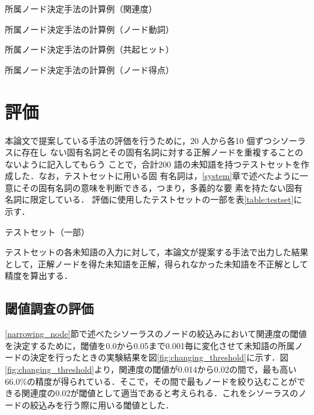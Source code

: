 \documentclass[japanese]{jnlp_1.4}
\begin{document}
\begin{table}[b]
\caption{所属ノード決定手法の計算例（関連度）}

\label{table:calculation_example_doa}
\end{table}

\begin{table}[t]
\caption{所属ノード決定手法の計算例（ノード動詞）}

\label{table:calculation_example_node_verb}
\end{table}
\begin{table}[t]
\caption{所属ノード決定手法の計算例（共起ヒット）}

\label{table:calculation_example_coincidence_hit}
\end{table}
\begin{table}[t]
\caption{所属ノード決定手法の計算例（ノード得点）}

\label{table:calculation_example_node_value}
\end{table}


\section{評価}\label{evaluation}

本論文で提案している手法の評価を行うために，20 人から各10 個ずつシソーラスに存在し
ない固有名詞とその固有名詞に対する正解ノードを重複することのないように記入してもらう
ことで，合計200 語の未知語を持つテストセットを作成した．なお，テストセットに用いる固
有名詞は，\ref{system}章で述べたように一意にその固有名詞の意味を判断できる，つまり，多義的な要
素を持たない固有名詞に限定している．
評価に使用したテストセットの一部を表\ref{table:testset}に示す．

\begin{table}[t]
\caption{テストセット（一部）}

\label{table:testset}
\end{table}

テストセットの各未知語の入力に対して，本論文が提案する手法で出力した結果として，正解ノードを得た未知語を正解，得られなかった未知語を不正解として精度を算出する．


\subsection{閾値調査の評価}\label{threshold_evaluation}

\ref{narrowing_node}節で述べたシソーラスのノードの絞込みにおいて関連度の閾値を決定するために，閾値を0.0から0.05まで0.001毎に変化させて未知語の所属ノードの決定を行ったときの実験結果を図\ref{fig:changing_threshold}に示す．図\ref{fig:changing_threshold}より，関連度の閾値が0.014から0.02の間で，最も高い66.0\%の精度が得られている．そこで，その間で最もノードを絞り込むことができる関連度の0.02が閾値として適当であると考えられる．これをシソーラスのノードの絞込みを行う際に用いる閾値とした．
\end{document}
